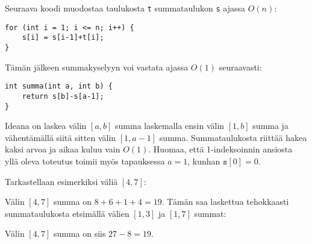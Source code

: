 Seuraava koodi muodostaa taulukosta \texttt{t}
summataulukon \texttt{s} ajassa $O(n)$:
\begin{lstlisting}
for (int i = 1; i <= n; i++) {
    s[i] = s[i-1]+t[i];
}
\end{lstlisting}
Tämän jälkeen summakyselyyn voi vastata
ajassa $O(1)$ seuraavasti:
\begin{lstlisting}
int summa(int a, int b) {
    return s[b]-s[a-1];
}
\end{lstlisting}

Ideana on laskea välin $[a,b]$ summa 
laskemalla ensin välin $[1,b]$ summa
ja vähentämällä siitä sitten välin $[1,a-1]$ summa.
Summataulukosta riittää hakea kaksi arvoa
ja aikaa kuluu vain $O(1)$.
Huomaa, että 1-indeksoinnin ansiosta
yllä oleva toteutus toimii myös tapauksessa $a=1$,
kunhan $\texttt{s}[0]=0$.

Tarkastellaan esimerkiksi väliä $[4,7]$:
\begin{center}
\end{center}
Välin $[4,7]$ summa on $8+6+1+4=19$.
Tämän saa laskettua tehokkaasti summataulukosta
etsimällä välien $[1,3]$ ja $[1,7]$ summat:
\begin{center}
\end{center}
Välin $[4,7]$ summa on siis $27-8=19$.

